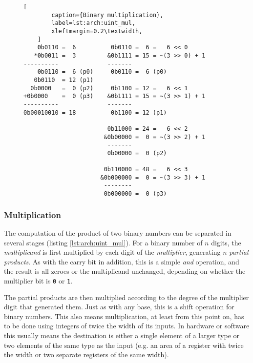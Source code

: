 
\begin{figure}[ht]
    \begin{lstlisting}[
        caption={Binary multiplication},
        label=lst:arch:uint_mul,
        xleftmargin=0.2\textwidth,
    ]
    0b0110 =  6          0b0110 =  6 =   6 << 0
   *0b0011 =  3         &0b1111 = 15 = ~(3 >> 0) + 1
----------              -------
    0b0110 =  6 (p0)     0b0110 =  6 (p0)
   0b0110  = 12 (p1)
  0b0000   =  0 (p2)     0b1100 = 12 =   6 << 1
+0b0000    =  0 (p3)    &0b1111 = 15 = ~(3 >> 1) + 1
----------              -------
0b00010010 = 18          0b1100 = 12 (p1)

                        0b11000 = 24 =   6 << 2
                       &0b00000 =  0 = ~(3 >> 2) + 1
                        -------
                        0b00000 =  0 (p2)

                       0b110000 = 48 =   6 << 3
                      &0b000000 =  0 = ~(3 >> 3) + 1
                       --------
                       0b000000 =  0 (p3)
    \end{lstlisting}
\end{figure}

\subsubsection{Multiplication}

The computation of the product of two binary numbers can be separated in several
stages (listing \ref{lst:arch:uint_mul}).  For a binary number of $n$ digits,
the \textit{multiplicand} is first multiplied by each digit of the
\textit{multiplier}, generating $n$ \textit{partial products}.  As with the
carry bit in addition, this is a simple \textit{and} operation, and the result
is all zeroes or the multiplicand unchanged, depending on whether the multiplier
bit is \texttt{0} or \texttt{1}.

The partial products are then multiplied according to the degree of the
multiplier digit that generated them.  Just as with any base, this is a shift
operation for binary numbers.  This also means multiplication, at least from
this point on, has to be done using integers of twice the width of its inputs.
In hardware or software this usually means the destination is either a single
element of a larger type or two elements of the same type as the input (e.g. an
area of a register with twice the width or two separate registers of the same
width).

